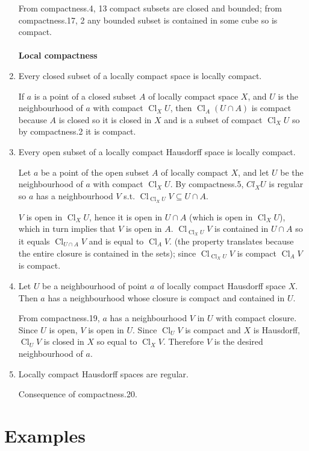 \documentclass{article}
\DeclareMathOperator{\Cl}{Cl}
\begin{document}
\begin{enumerate}
From \color{gray}compactness.4, 13 \color{black} compact subsets are closed and bounded; from \color{gray}compactness.17, 2 \color{black} any bounded subset is contained in some cube so is compact.
\\\\
\textbf{Local compactness}
\item Every closed subset of a locally compact space is locally compact.

If \(a\) is a point of a closed subset \(A\) of locally compact space \(X\), and \(U\) is the neighbourhood of \(a\) with compact \(\Cl_{X}U\), then \(\Cl_{A}(U\cap A)\) is compact because 
\(A\) is closed so it is closed in \(X\) and is a subset of compact \(\Cl_{X}U\) so by \color{gray}compactness.2 \color{black} it is compact.
\item Every open subset of a locally compact Hausdorff space is locally compact.

Let \(a\) be a point of the open subset \(A\) of locally compact \(X\), and let \(U\) be the neighbourhood of \(a\) with compact \(\Cl_{X}U\). By \color{gray}compactness.5\color{black}, \(Cl_{X}U\) is regular so \(a\) 
has a neighbourhood \(V\) s.t. \(\Cl_{\Cl_{X}U}V\subseteq U\cap A\). 

\(V\) is open in \(\Cl_{X}U\), hence it is open in \(U\cap A\) (which is open in \(\Cl_{X}U\)), which in turn implies that \(V\) is open in \(A\). 
\(\Cl_{\Cl_{X}U}V\) is contained in \(U\cap A\) so it equals \(\Cl_{U\cap A}V\) and is equal to \(\Cl_{A}V\). (the property translates because the entire closure is contained in the sets); since \(\Cl_{\Cl_{X}U}V\) is compact \(\Cl_{A}V\) is compact.
\item Let \(U\)  be a neighbourhood of point \(a\) of locally compact Hausdorff space \(X\). Then \(a\) has a neighbourhood whose closure is compact and contained in \(U\).

From \color{gray}compactness.19\color{black}, \(a\) has a neighbourhood \(V\) in \(U\) with compact closure. Since \(U\) is open, \(V\) is open in \(U\). Since \(\Cl_{U}V\) is compact and \(X\) is Hausdorff, \(\Cl_{U}V\) is closed in \(X\) so equal to \(\Cl_{X}V\). Therefore \(V\) is the desired neighbourhood of \(a\).
\item Locally compact Hausdorff spaces are regular.

Consequence of \color{gray}compactness.20\color{black}.
\end{enumerate}
\section{Examples}
\end{document}
